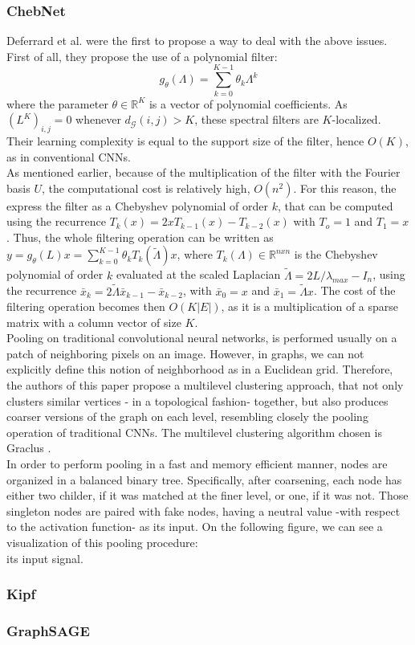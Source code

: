 \subsubsection*{ChebNet\cite{defferard}}
Deferrard et al. \cite{defferard} were the first to propose a way to deal with
the above issues.\\
 First of all, they propose the use of a polynomial filter:\\
\begin{equation}
g_{\theta}(\Lambda ) = \sum_{k=0}^{K-1}\theta_k \Lambda^k
\end{equation}
where the parameter $\theta \in \mathbb{R}^K$ is a vector of polynomial
coefficients. As $(L^K)_{i,j} = 0$ whenever $d_{\mathcal{G}}(i,j)>K$, these
spectral filters are $K$-localized.\\
 Their learning complexity is equal to the support
size of the filter, hence $O(K)$, as in conventional CNNs.\\
 As mentioned earlier, because of the
multiplication of the filter with the Fourier basis $U$, the computational cost
is relatively high, $O(n^2)$. For this reason, the express the filter as a
Chebyshev polynomial of order $k$, that can be computed using the recurrence
$T_k(x) = 2xT_{k-1}(x)-T_{k-2}(x)$ with $T_o = 1$ and $T_1 = x$. Thus, the whole
filtering operation can be written as $y = g_{\theta}(L)x =
\sum_{k=0}^{K-1}\theta_k T_k (\widetilde{\Lambda })x$, where $T_k (\Lambda ) \in
\mathbb{R}^{nxn}$ is the Chebyshev polynomial of order $k$ evaluated at the
scaled Laplacian $\widetilde{\Lambda} = 2L/\lambda_{max} - I_n$, using the
recurrence $\bar{x}_k = 2\widetilde{\Lambda}\bar{x}_{k-1} - \bar{x}_{k-2}$, with
$\bar{x}_0 = x$ and $\bar{x}_1 = \widetilde{\Lambda}x$. The cost of the
filtering operation becomes then $O(K|E|)$, as it is a multiplication of a
sparse matrix with a column vector of size $K$.\\
Pooling on traditional convolutional neural networks, is performed usually on a
patch of neighboring pixels on an image. However, in graphs, we can not explicitly
define this notion of neighborhood as in a Euclidean grid. Therefore, the authors of
this paper propose a multilevel clustering approach, that not only clusters
similar vertices - in a topological fashion- together, but also produces coarser
versions of the graph on each level, resembling closely the pooling operation of traditional
CNNs. The multilevel clustering algorithm chosen is Graclus \cite{Kulis}.\\
In order to perform pooling in a fast and memory efficient manner, nodes are
organized in a balanced binary tree. Specifically, after coarsening, each node
has either two childer, if it was matched at the finer level, or one, if it was
not. Those singleton nodes are paired with fake nodes, having a neutral value
-with respect to the activation function- as its input. On the following figure,
we can see a visualization of this pooling procedure:\\

its input signal.
\subsubsection*{Kipf}

\subsubsection*{GraphSAGE}
